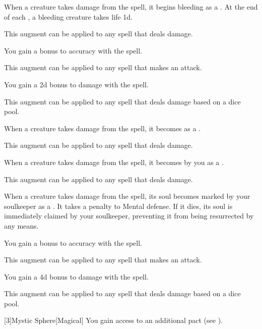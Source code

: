 {            %
             When a creature takes damage from the spell, it begins bleeding as a .
            At the end of each , a bleeding creature takes life  \minus1d.
            \par This augment can be applied to any spell that deals damage.

             You gain a  bonus to accuracy with the spell.
            \par This augment can be applied to any spell that makes an attack.

             You gain a \plus2d bonus to damage with the spell.
            \par This augment can be applied to any spell that deals damage based on a dice pool.

             When a creature takes damage from the spell, it becomes  as a .
            \par This augment can be applied to any spell that deals damage.

             When a creature takes damage from the spell, it becomes  by you as a .
            \par This augment can be applied to any spell that deals damage.

             When a creature takes damage from the spell, its soul becomes marked by your soulkeeper as a .
            It takes a  penalty to Mental defense.
            If it dies, its soul is immediately claimed by your soulkeeper, preventing it from being resurrected by any means.

             You gain a  bonus to accuracy with the spell.
            \par This augment can be applied to any spell that makes an attack.

             You gain a \plus4d bonus to damage with the spell.
            \par This augment can be applied to any spell that deals damage based on a dice pool.
        }

        [3]{Mystic Sphere}[Magical]
        You gain access to an additional pact  (see ).

